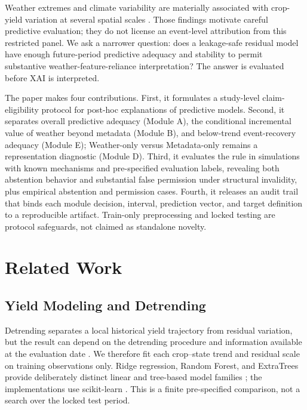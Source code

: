 \documentclass[conference]{IEEEtran}
\begin{document}
Weather extremes and climate variability are materially associated with crop-yield
variation at several spatial scales \cite{Lesk2016,Ray2015,SchlenkerRoberts2009,Zampieri2017,Schierhorn2021}.
Those findings motivate careful predictive evaluation; they do not license an
event-level attribution from this restricted panel. We ask a narrower question:
does a leakage-safe residual model have enough future-period predictive adequacy and stability
to permit substantive weather-feature-reliance interpretation? The answer is
evaluated before XAI is interpreted.

The paper makes four contributions. First, it formulates a study-level
claim-eligibility protocol for post-hoc explanations of predictive models. Second,
it separates overall predictive adequacy (Module A), the conditional incremental
value of weather beyond metadata (Module B), and below-trend event-recovery
adequacy (Module E); Weather-only versus Metadata-only remains a representation diagnostic
(Module D). Third, it evaluates the rule in simulations with known mechanisms and
pre-specified evaluation labels, revealing both abstention behavior and
substantial false permission under structural invalidity, plus empirical
abstention and permission cases. Fourth, it
releases an audit trail that binds each module decision, interval, prediction vector, and
target definition to a reproducible artifact. Train-only preprocessing and locked
testing are protocol safeguards, not claimed as standalone novelty.

\section{Related Work}
\subsection{Yield Modeling and Detrending}
Detrending separates a local historical yield trajectory from residual variation,
but the result can depend on the detrending procedure and information available at
the evaluation date \cite{Lu2017,Meng2024}. We therefore fit each crop--state trend
and residual scale on training observations only. Ridge regression, Random Forest,
and ExtraTrees provide deliberately distinct linear and tree-based model families
\cite{HoerlKennard1970,Breiman2001,Geurts2006}; the implementations use
scikit-learn \cite{Pedregosa2011}. This is a finite pre-specified comparison, not
a search over the locked test period.
\end{document}
